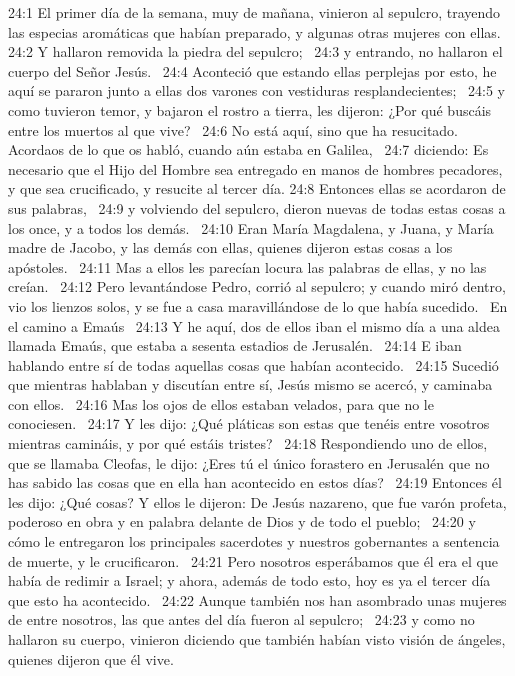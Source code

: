 24:1 El primer día de la semana, muy de mañana, vinieron al sepulcro, trayendo las especias aromáticas que habían preparado, y algunas otras mujeres con ellas.  
24:2 Y hallaron removida la piedra del sepulcro;  
24:3 y entrando, no hallaron el cuerpo del Señor Jesús.  
24:4 Aconteció que estando ellas perplejas por esto, he aquí se pararon junto a ellas dos varones con vestiduras resplandecientes;  
24:5 y como tuvieron temor, y bajaron el rostro a tierra, les dijeron: ¿Por qué buscáis entre los muertos al que vive?  
24:6 No está aquí, sino que ha resucitado. Acordaos de lo que os habló, cuando aún estaba en Galilea,  
24:7 diciendo: Es necesario que el Hijo del Hombre sea entregado en manos de hombres pecadores, y que sea crucificado, y resucite al tercer día. 
24:8 Entonces ellas se acordaron de sus palabras,  
24:9 y volviendo del sepulcro, dieron nuevas de todas estas cosas a los once, y a todos los demás.  
24:10 Eran María Magdalena, y Juana, y María madre de Jacobo, y las demás con ellas, quienes dijeron estas cosas a los apóstoles.  
24:11 Mas a ellos les parecían locura las palabras de ellas, y no las creían.  
24:12 Pero levantándose Pedro, corrió al sepulcro; y cuando miró dentro, vio los lienzos solos, y se fue a casa maravillándose de lo que había sucedido.  
En el camino a Emaús  
24:13 Y he aquí, dos de ellos iban el mismo día a una aldea llamada Emaús, que estaba a sesenta estadios de Jerusalén.  
24:14 E iban hablando entre sí de todas aquellas cosas que habían acontecido.  
24:15 Sucedió que mientras hablaban y discutían entre sí, Jesús mismo se acercó, y caminaba con ellos.  
24:16 Mas los ojos de ellos estaban velados, para que no le conociesen.  
24:17 Y les dijo: ¿Qué pláticas son estas que tenéis entre vosotros mientras camináis, y por qué estáis tristes?  
24:18 Respondiendo uno de ellos, que se llamaba Cleofas, le dijo: ¿Eres tú el único forastero en Jerusalén que no has sabido las cosas que en ella han acontecido en estos días?  
24:19 Entonces él les dijo: ¿Qué cosas? Y ellos le dijeron: De Jesús nazareno, que fue varón profeta, poderoso en obra y en palabra delante de Dios y de todo el pueblo;  
24:20 y cómo le entregaron los principales sacerdotes y nuestros gobernantes a sentencia de muerte, y le crucificaron.  
24:21 Pero nosotros esperábamos que él era el que había de redimir a Israel; y ahora, además de todo esto, hoy es ya el tercer día que esto ha acontecido.  
24:22 Aunque también nos han asombrado unas mujeres de entre nosotros, las que antes del día fueron al sepulcro;  
24:23 y como no hallaron su cuerpo, vinieron diciendo que también habían visto visión de ángeles, quienes dijeron que él vive.  
